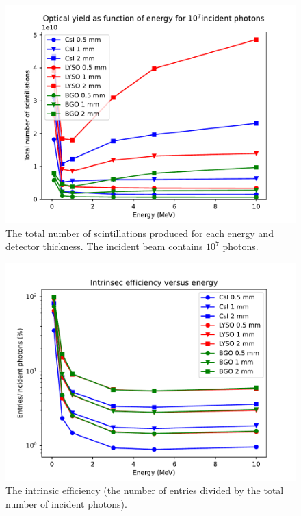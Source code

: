 \documentclass{article}
\begin{document}
\begin{figure}[H]
    \centering
    \includegraphics[width=0.8\linewidth]{images/task6/scintillations_all.pdf}
    \caption{The total number of scintillations produced for each energy and detector thickness. 
    The incident beam contains $10^7$ photons.}
\end{figure}

\begin{figure}[H]
    \centering
    \includegraphics[width=0.8\linewidth]{images/task6/intrinsic_eff.pdf}
    \caption{The intrinsic efficiency (the number of entries divided by the total number of incident photons).}
\end{figure}
\end{document}
